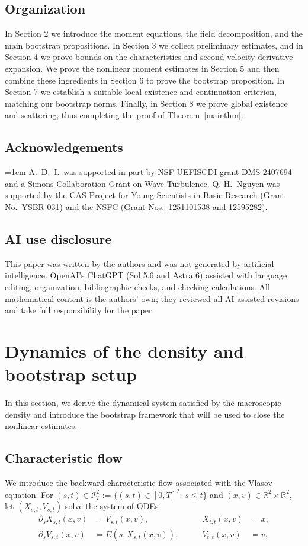 \documentclass[reqno,11pt]{amsart}
\numberwithin{equation}{section}
\begin{document}
\subsection{Organization}
In Section 2 we introduce the moment equations, the field decomposition, and
the main bootstrap propositions. In Section 3 we collect preliminary estimates,
and in Section 4 we prove bounds on the characteristics and second velocity
derivative expansion. We prove the nonlinear moment estimates in 
Section 5 and then combine these ingredients in Section 6 to prove the bootstrap
proposition. In Section 7 we establish a suitable local existence and continuation criterion, matching our bootstrap norms.
Finally, in Section 8 we prove global existence and scattering, thus completing
the proof of Theorem~\ref{mainthm}.

\subsection*{Acknowledgements}
\begingroup
\emergencystretch=1em
A.~D.~I.\ was supported in part by NSF-UEFISCDI grant DMS-2407694
and a Simons Collaboration Grant on Wave Turbulence.
Q.-H.~Nguyen was supported by the CAS Project for Young Scientists in
Basic Research (Grant No.~YSBR-031) and the NSFC (Grant Nos.~1251101538
and 12595282).
\par\endgroup

\subsection*{AI use disclosure}
This paper was written by the authors and was not generated by artificial
intelligence. OpenAI's ChatGPT (Sol 5.6 and Astra 6) assisted with language
editing, organization, bibliographic checks, and checking calculations.
All mathematical content is the authors' own; they reviewed all AI-assisted
revisions and take full responsibility for the paper.


	
	\section{Dynamics of the density and bootstrap setup} 
	In this section, we derive the dynamical system satisfied by the macroscopic
	density and introduce the bootstrap framework that will be used
	to close the nonlinear estimates.
	\subsection{Characteristic flow}
	We introduce the backward characteristic flow associated with the Vlasov equation.
	For $(s,t)\in\mathcal{I}_T^2:=\{(s,t)\in[0,T]^2:\, s\le t\}$ and $(x,v)\in\mathbb{R}^2\times\mathbb{R}^2$,
	let $(X_{s,t},V_{s,t})$ solve the system of ODEs
	\begin{equation}\label{Lan1}
		\begin{aligned}
			\partial_s X_{s,t}(x,v) &= V_{s,t}(x,v), 
			&\qquad X_{t,t}(x,v) &= x,\\
			\partial_s V_{s,t}(x,v) &= E(s,X_{s,t}(x,v)),
			&\qquad V_{t,t}(x,v) &= v.
		\end{aligned}
	\end{equation}
	
\end{document}
